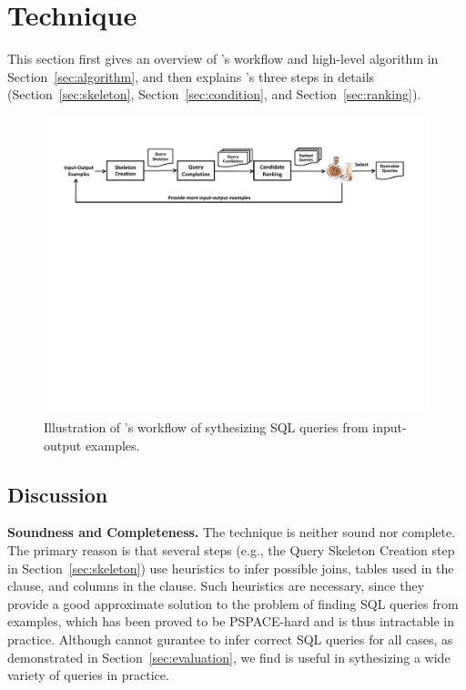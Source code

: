 
\section{Technique}
\label{sec:approach}

This section first gives an overview of \ourtool's
workflow and high-level algorithm in Section~\ref{sec:algorithm}, and
then explains \ourtool's three steps in details (Section~\ref{sec:skeleton},
Section~\ref{sec:condition}, and Section~\ref{sec:ranking}).



\begin{figure}[t]
  \centering
  \includegraphics[scale=0.70]{workflow}
  \vspace*{-1.0ex}\caption {{\label{fig:workflow} Illustration
  of \ourtool's workflow of sythesizing SQL queries from input-output examples. 
}}

\end{figure}










\subsection{Discussion}
\label{sec:uim}


\noindent \textbf{Soundness and Completeness.} The \ourtool
technique is neither sound nor complete. The primary
reason is that several steps (e.g., the Query Skeleton Creation
step in Section~\ref{sec:skeleton}) use heuristics
to infer possible joins, tables used in the  clause,
and columns in the  clause.
Such heuristics are necessary, since they provide a
good approximate solution to the problem of finding SQL queries
from examples, which has been proved to be
PSPACE-hard and is thus intractable in practice.
Although \ourtool cannot gurantee to infer correct SQL queries
for all cases, as demonstrated in Section~\ref{sec:evaluation},
we find \ourtool
is useful in sythesizing a wide variety of queries in practice.

